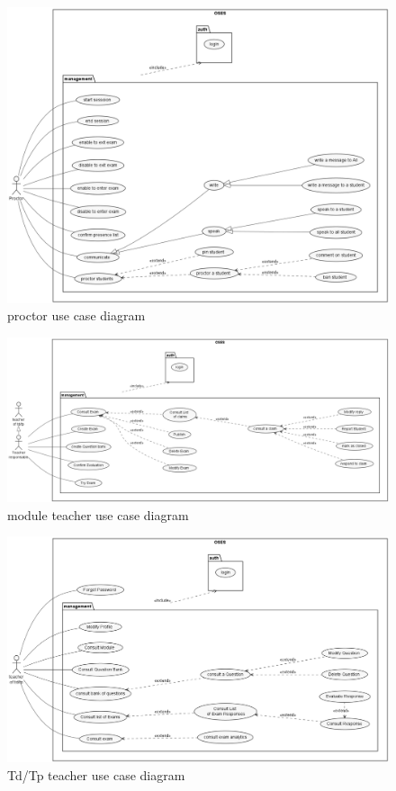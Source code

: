 \documentclass[a4paper,12p]{article}
\begin{document}
     \begin{figure}[h]
         \centering
         \includegraphics[width=\textwidth]{proctor_UCD}
         \caption{proctor use case diagram}
     \end{figure}

    \begin{figure}[h]
        \centering
        \includegraphics[width=450pt]{Module_Teacher}
        \caption{module teacher use case diagram}
    \end{figure}

    \begin{figure}[h]
        \centering
        \includegraphics[width=\textwidth]{TP_TD_Teacher}
        \caption{Td/Tp teacher use case diagram}
    \end{figure}
\end{document}
